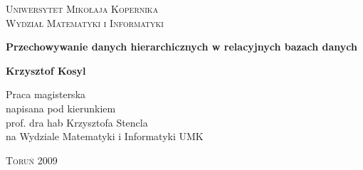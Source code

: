 


\begin{titlepage}
    \begin{center}
        \large\scshape Uniwersytet Mikołaja Kopernika\\
        Wydział Matematyki i Informatyki
    \end{center}
    \vspace{18ex}
    \begin{center}
        \Large\bfseries
        Przechowywanie danych hierarchicznych w relacyjnych bazach danych
    \end{center}
    \vspace{18ex}
    \begin{center}
        \large\bfseries
        Krzysztof Kosyl
    \end{center}
    \vspace{15ex}
    \hspace*{\fill}
    \parbox{0.56\textwidth}{\setlength{\parindent}{1em}
            \small
            \noindent
            Praca magisterska\\
            napisana pod kierunkiem\\
            prof. dra hab Krzysztofa Stencla\\
            na Wydziale Matematyki i Informatyki UMK}
    \vfill
    \centerline{\textsc{Toruń} 2009}
    \addtocounter{page}{-1}
\end{titlepage}



% 
% 
% 
% 
% 
% 
% 
